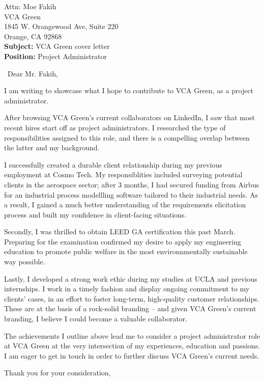 \documentclass{letter}
\begin{document}
\signature{Marius Peter}
\longindentation=0pt
\address{Marius Peter\\
    11090 Strathmore Dr\\
    Los Angeles CA 90024
}


\begin{letter}{Attn: Moe Fakih\\
        VCA Green\\
        1845 W. Orangewood Ave, Suite 220\\
        Orange, CA 92868\\
        \bigskip
        \textbf{Subject:} VCA Green cover letter\\
        \textbf{Position:} Project Administrator
    }

    \opening{\vfill~Dear Mr. Fakih,}

    I am writing to showcase what I hope to contribute to VCA Green, as a project administrator. 

    After browsing VCA Green's current collaborators on LinkedIn, I saw that most recent hires start off as project administrators.
    I researched the type of responsibilities assigned to this role, and there is a compelling overlap between the latter and my background. 

    I successfully created a durable client relationship during my previous employment at Cosmo Tech.
    My responsiblities included surveying potential clients in the aerospace sector;
    after 3 months, I had secured funding from Airbus for an industrial process modellling software tailored to their industrial needs.
    As a result, I gained a much better understanding of the requirements elicitation process and built my confidence in client-facing situations. 

    Secondly, I was thrilled to obtain LEED GA certification this past March.
    Preparing for the examination confirmed my desire to apply my engineering education to promote public welfare in the most environnmentally sustainable way possible.

    Lastly, I developed a strong work ethic during my studies at UCLA and previous internships.
    I work in a timely fashion and display ongoing commitment to my clients' cases, in an effort to foster long-term, high-quality customer relationships.
    These are at the basis of a rock-solid branding -- and given VCA Green's current branding, I believe I could become a valuable collaborator. 

    The achievements I outline above lead me to consider a project administrator role at VCA Green at the very intersection of my experiences, education and passions.
    I am eager to get in touch in order to further discuss VCA Green's current needs.

    \closing{Thank you for your consideration,}

\end{letter}
\end{document}
